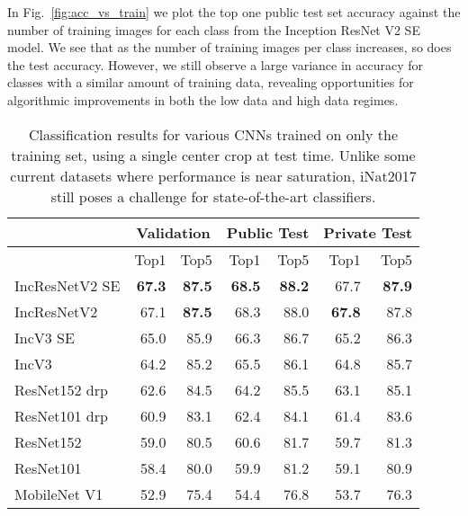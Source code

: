 \documentclass[10pt,twocolumn,letterpaper]{article}
\begin{document}
In Fig.~\ref{fig:acc_vs_train} we plot the top one public test set accuracy against the number of training images for each class from the Inception ResNet V2 SE model. 
We see that as the number of training images per class increases, so does the test accuracy. 
However, we still observe a large variance in accuracy for classes with a similar amount of training data, revealing opportunities for algorithmic improvements in both the low data and high data regimes.


\begin{table}[t]
\footnotesize
\begin{center}
\begin{tabular}{ l|r|r|r|r|r|r } 
 \hline
 & \multicolumn{2}{|c}{\bf Validation} & \multicolumn{2}{|c}{\bf Public Test} & \multicolumn{2}{|c}{\bf Private Test} \\ \hline
 & Top1 & Top5 & Top1 & Top5      & Top1 & Top5 \\ \hline
 IncResNetV2 SE        & {\bf 67.3} & {\bf 87.5} & {\bf 68.5}  & {\bf 88.2}         & 67.7 & {\bf 87.9}\\ 
 IncResNetV2 & 67.1 & {\bf 87.5} & 68.3 &	88.0 & {\bf 67.8} &	87.8\\ 
 IncV3 SE               & 65.0 & 85.9 & 66.3 &	86.7        & 65.2 &	86.3\\ 
 IncV3 & 64.2 & 85.2 & 65.5 &	86.1 & 64.8 &	85.7\\ 
 ResNet152 drp           & 62.6 & 84.5 & 64.2 &	85.5    & 63.1 &	85.1\\ 
 ResNet101 drp          & 60.9 & 83.1 & 62.4 &	84.1     & 61.4 &	83.6\\ 
 ResNet152               & 59.0 & 80.5    & 60.6 & 	81.7     & 59.7 &	81.3\\  
 ResNet101              & 58.4 & 80.0     & 59.9 &	81.2     & 59.1 &	80.9\\  
 MobileNet V1          & 52.9 & 75.4   & 54.4 &	76.8 & 53.7 &	76.3\\ \hline
\end{tabular}
\end{center}
\caption{Classification results for various CNNs trained on only the training set, using a single center crop at test time. Unlike some current datasets where performance is near saturation, iNat2017 still poses a challenge for state-of-the-art classifiers.}
\label{tab:class_baselines}
\end{table}
\end{document}
